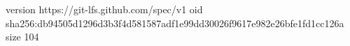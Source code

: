version https://git-lfs.github.com/spec/v1
oid sha256:db94505d1296d3b3f4d581587adf1e99dd30026f9617e982e26bfe1fd1cc126a
size 104
